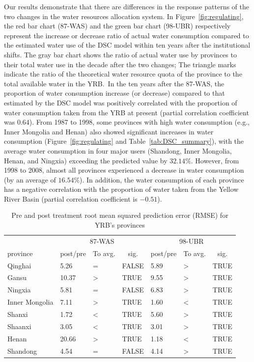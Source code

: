 \documentclass[preprint, 12pt]{elsarticle}
\begin{document}
Our results demonstrate that there are differences in the response patterns of the two changes in the water resources allocation system.
In Figure~\ref{fig:regulating}, the red bar chart (87-WAS) and the green bar chart (98-UBR) respectively represent the increase or decrease ratio of actual water consumption compared to the estimated water use of the DSC model within ten years after the institutional shifts.
The gray bar chart shows the ratio of actual water use by provinces to their total water use in the decade after the two changes; The triangle marks indicate the ratio of the theoretical water resource quota of the province to the total available water in the YRB.\
In the ten years after the 87-WAS, the proportion of water consumption increase (or decrease) compared to that estimated by the DSC model was positively correlated with the proportion of water consumption taken from the YRB at present (partial correlation coefficient was $0.64$).
From 1987 to 1998, some provinces with high water consumption (e.g., Inner Mongolia and Henan) also showed significant increases in water consumption (Figure~\ref{fig:regulating} and Table~\ref{tab:DSC_summary}), with the average water consumption in four major users (Shandong, Inner Mongolia, Henan, and Ningxia) exceeding the predicted value by $32.14\%$.
However, from 1998 to 2008, almost all provinces experienced a decrease in water consumption (by an average of $16.54\%$).
In addition, the water consumption of each province has a negative correlation with the proportion of water taken from the Yellow River Basin (partial correlation coefficient is $-0.51$).


\begin{table}[!htbp]\footnotesize
	\centering
	\caption{Pre and post treatment root mean squared prediction error (RMSE) for YRB's provinces}\label{tab:DSC_summary}
	\begin{tabularx}{0.8\textwidth}{XXXXXXX}
	  \toprule
			& \multicolumn{3}{c}{87-WAS} & \multicolumn{3}{c}{98-UBR} \\
  \cmidrule{2-7}    province  & \multicolumn{1}{c}{post/pre} & To avg. & \multicolumn{1}{c}{sig.} & \multicolumn{1}{c}{post/pre} & To avg.   & \multicolumn{1}{c}{sig.} \\
	  \midrule
	  Qinghai & 5.26  & =     & FALSE & 5.89  & >     & TRUE \\
	  Gansu & 10.37  & >     & TRUE  & 9.55  & >     & TRUE \\
	  Ningxia & 5.81  & =     & FALSE & 6.83  & >     & TRUE \\
	  Inner Mongolia & 7.11  & >     & TRUE  & 1.60  & <     & TRUE \\
	  Shanxi & 1.72  & <     & TRUE  & 5.60  & >     & TRUE \\
	  Shaanxi & 3.05  & <     & TRUE  & 3.01  & >     & TRUE \\
	  Henan & 20.66  & >     & TRUE  & 1.18  & <     & TRUE \\
	  Shandong & 4.54  & =     & FALSE & 4.14  & >     & TRUE \\
	  \bottomrule
	  \end{tabularx}\label{tab:addlabel}\end{table}
\end{document}
